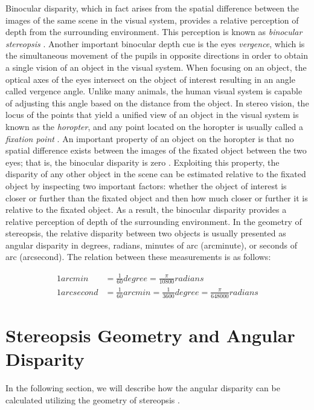 Binocular disparity, which in fact arises from the spatial difference 
between the images of the same scene in the visual system, provides a relative perception of depth 
from the surrounding environment. This perception is known as {\it binocular stereopsis} \cite{how95}. 
Another important binocular depth cue is the eyes {\it vergence}, which is the simultaneous movement of the pupils in opposite directions in order to obtain a single vision of an object in the visual system. 
When focusing on an object, the optical axes of the eyes intersect on the object of interest resulting in an angle called vergence angle. Unlike many animals, the human visual system 
is capable of adjusting this angle based on the distance from the object.
In stereo vision, the locus of the points that yield a unified view of an object in the visual system is 
known as the {\it horopter}, and any point located on the horopter is usually called a 
{\it fixation point} \cite{binr83,how95}.
An important property of an object on the horopter is that no spatial difference
exists between the images of the fixated object between the two eyes; that is, the binocular disparity is zero \cite{how95}. 
Exploiting this property, the disparity of any other object in the scene can be estimated relative to the fixated object by inspecting two important factors: 
whether the object of interest is closer or further than the fixated object and then how much closer or further it is relative to the fixated object.
As a result, the binocular disparity provides a relative perception of depth of the surrounding environment.
In the geometry of stereopsis, the relative disparity between two objects is usually presented as 
angular disparity in degrees, radians, minutes of arc (arcminute), 
or seconds of arc (arcsecond). The relation between these measurements is as follows:

\begin{align}
1 arcmin &= \frac{1}{60} degree = \frac{\pi}{10800} radians \label{eq:arcmin} \\
1 arcsecond &= \frac{1}{60} arcmin = \frac{1}{3600} degree = \frac{\pi}{648000} radians \label{eq:arcsec}
\end{align}

\section{Stereopsis Geometry and Angular Disparity}

In the following section, we will describe how the angular disparity can be calculated utilizing the geometry of stereopsis \cite{binr83}.


